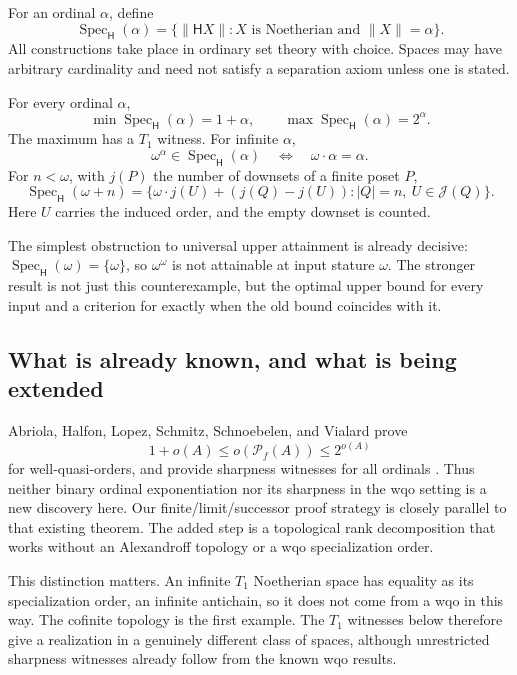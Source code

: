 \documentclass[11pt,a4paper]{article}
\theoremstyle{definition}
\newcommand{\HH}{\mathsf H}
\newcommand{\JJ}{\mathcal J}
\newcommand{\st}[1]{\lVert #1\rVert}
\newcommand{\Spec}{\operatorname{Spec}_{\HH}}
\numberwithin{equation}{section}
\begin{document}
For an ordinal $\alpha$, define
\[
 \Spec(\alpha)=\{\st{\HH X}:X\text{ is Noetherian and }\st X=\alpha\}.
\]
All constructions take place in ordinary set theory with choice.  Spaces
may have arbitrary cardinality and need not satisfy a separation axiom
unless one is stated.

\begin{tcolorbox}[colback=PaleOlive,colframe=OliveInk,boxrule=0.5pt,
 arc=1mm,title={Main results proved in this manuscript},fonttitle=\bfseries]
For every ordinal $\alpha$,
\[
 \min\Spec(\alpha)=1+\alpha,
 \qquad \max\Spec(\alpha)=2^\alpha.
\]
The maximum has a $T_1$ witness.  For infinite $\alpha$,
\[
 \omega^\alpha\in\Spec(\alpha)
 \quad\Longleftrightarrow\quad \omega\cdot\alpha=\alpha.
\]
For $n<\omega$, with $j(P)$ the number of downsets of a finite poset $P$,
\[
 \Spec(\omega+n)=
 \bigl\{\omega\cdot j(U)+(j(Q)-j(U)):
          |Q|=n,\ U\in\JJ(Q)\bigr\}.
\]
Here $U$ carries the induced order, and the empty downset is counted.
\end{tcolorbox}

The simplest obstruction to universal upper attainment is already decisive: $\Spec(\omega)=\{\omega\}$, so $\omega^\omega$ is not attainable at
input stature $\omega$.  The stronger result is not just this counterexample,
but the optimal upper bound for every input and a criterion for exactly
when the old bound coincides with it.

\subsection{What is already known, and what is being extended}

Abriola, Halfon, Lopez, Schmitz, Schnoebelen, and Vialard prove
\[
  1+o(A)\leq o(\mathcal P_f(A))\leq 2^{o(A)}
\]
for well-quasi-orders, and provide sharpness witnesses for all ordinals
\cite[Theorems~3.3 and~4.3]{AHLLSSV24}.  Thus neither binary ordinal
exponentiation nor its sharpness in the wqo setting is a new discovery
here.  Our finite/limit/successor proof strategy is closely parallel to
that existing theorem.  The added step is a topological rank decomposition
that works without an Alexandroff topology or a wqo specialization order.

This distinction matters.  An infinite $T_1$ Noetherian space has equality
as its specialization order, an infinite antichain, so it does not come
from a wqo in this way.  The cofinite topology is the first example.  The
$T_1$ witnesses below therefore give a realization in a genuinely different
class of spaces, although unrestricted sharpness witnesses already follow
from the known wqo results.
\end{document}
